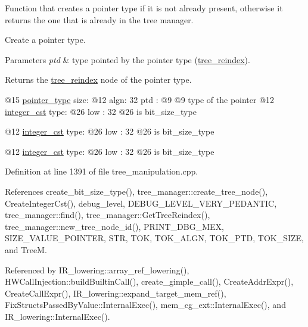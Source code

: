 Function that creates a pointer type if it is not already present, otherwise it returns the one that is already in the tree manager. 

Create a pointer type.


\begin{DoxyParams}{Parameters}
{\em ptd} & type pointed by the pointer type (\hyperlink{classtree__reindex}{tree\+\_\+reindex}). \\
\hline
\end{DoxyParams}
\begin{DoxyReturn}{Returns}
the \hyperlink{classtree__reindex}{tree\+\_\+reindex} node of the pointer type. 
\end{DoxyReturn}
@15 \hyperlink{structpointer__type}{pointer\+\_\+type} size\+: @12 algn\+: 32 ptd \+: @9 @9 type of the pointer @12 \hyperlink{structinteger__cst}{integer\+\_\+cst} type\+: @26 low \+: 32 @26 is bit\+\_\+size\+\_\+type

@12 \hyperlink{structinteger__cst}{integer\+\_\+cst} type\+: @26 low \+: 32 @26 is bit\+\_\+size\+\_\+type

@12 \hyperlink{structinteger__cst}{integer\+\_\+cst} type\+: @26 low \+: 32 @26 is bit\+\_\+size\+\_\+type 

Definition at line 1391 of file tree\+\_\+manipulation.\+cpp.



References create\+\_\+bit\+\_\+size\+\_\+type(), tree\+\_\+manager\+::create\+\_\+tree\+\_\+node(), Create\+Integer\+Cst(), debug\+\_\+level, D\+E\+B\+U\+G\+\_\+\+L\+E\+V\+E\+L\+\_\+\+V\+E\+R\+Y\+\_\+\+P\+E\+D\+A\+N\+T\+IC, tree\+\_\+manager\+::find(), tree\+\_\+manager\+::\+Get\+Tree\+Reindex(), tree\+\_\+manager\+::new\+\_\+tree\+\_\+node\+\_\+id(), P\+R\+I\+N\+T\+\_\+\+D\+B\+G\+\_\+\+M\+EX, S\+I\+Z\+E\+\_\+\+V\+A\+L\+U\+E\+\_\+\+P\+O\+I\+N\+T\+ER, S\+TR, T\+OK, T\+O\+K\+\_\+\+A\+L\+GN, T\+O\+K\+\_\+\+P\+TD, T\+O\+K\+\_\+\+S\+I\+ZE, and TreeM.



Referenced by I\+R\+\_\+lowering\+::array\+\_\+ref\+\_\+lowering(), H\+W\+Call\+Injection\+::build\+Builtin\+Call(), create\+\_\+gimple\+\_\+call(), Create\+Addr\+Expr(), Create\+Call\+Expr(), I\+R\+\_\+lowering\+::expand\+\_\+target\+\_\+mem\+\_\+ref(), Fix\+Structs\+Passed\+By\+Value\+::\+Internal\+Exec(), mem\+\_\+cg\+\_\+ext\+::\+Internal\+Exec(), and I\+R\+\_\+lowering\+::\+Internal\+Exec().

